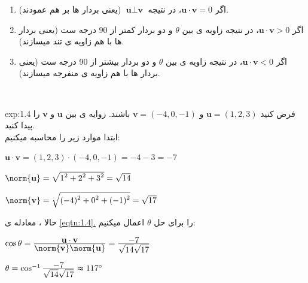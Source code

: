 {\begin{spacing}{1.5}
        \begin{enumerate}[label=\textbf{\arabic*}.]
            \item {اگر $\textbf{u}\cdot\textbf{v}=0$، در نتیجه $\textbf{u}\perp\textbf{v}$ (یعنی بردار ها بر هم عمودند).}
            \item {اگر $\textbf{u}\cdot\textbf{v}>0$، در نتیجه زاویه ی بین $\theta$ و دو بردار کمتر از 90 درجه ست (یعنی بردار ها با هم زاویه ی تند میسازند).}
            \item {اگر $\textbf{u}\cdot\textbf{v}<0$، در نتیجه زاویه ی بین $\theta$ و دو بردار بیشتر از 90 درجه ست (یعنی بردار ها با هم زاویه ی منفرجه میسازند).}
        \end{enumerate} \\

        \begin{example}{exp:1.4}
            فرض کنید $\textbf{u}=(1,2,3)$ و $\textbf{v}=(-4,0,-1)$ باشند. زوایه ی بین $\textbf{u}$ و $\textbf{v}$ را پیدا کنید. \\
            ابتدا موارد زیر را محاسبه میکنیم:

            \begin{center}
                $\textbf{u}\cdot\textbf{v}=(1,2,3)\cdot(-4,0,-1)=-4-3=-7$

                $\norm{\textbf{u}}=\sqrt{\displaystyle 1^2+2^2+3^2}=\sqrt{\displaystyle 14}$

                $\norm{\textbf{v}}=\sqrt{\displaystyle (-4)^2+0^2+(-1)^2}=\sqrt{\displaystyle 17}$
            \end{center}

            حالا ، معادله ی \hyperref[eqtn:1.4]{\ref{eqtn:1.4}.} را برای حل $\theta$ اعمال میکنیم:

            \begin{center}
                $\cos\theta=\frac{\displaystyle\textbf{u}\cdot\textbf{v}}{\displaystyle\norm{\textbf{v}}\norm{\textbf{u}}}=\frac{\displaystyle -7}{\displaystyle \sqrt{\displaystyle 14}\sqrt{\displaystyle 17}}$

                $\theta=\cos^{-1}\frac{\displaystyle -7}{\displaystyle \sqrt{\displaystyle 14}\sqrt{\displaystyle 17}}\thickapprox 117^\circ$
            \end{center}
        \end{example}


\end{spacing}}
